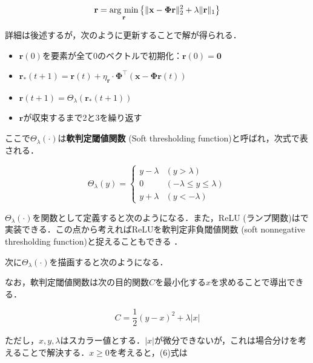 \begin{equation}
\mathbf{r} = \mathop{\rm arg~min}\limits_{\mathbf{r}}\left\{\|\mathbf{x}-\mathbf{\Phi}\mathbf{r}\|^2_2+\lambda\|\mathbf{r}\|_1\right\}
\end{equation}


詳細は後述するが，次のように更新することで解が得られる．

\begin{itemize}
\item $\mathbf{r}(0)$を要素が全て0のベクトルで初期化：$\mathbf{r}(0)=\mathbf{0}$
\item $\mathbf{r}_*(t+1)=\mathbf{r}(t)+\eta_\mathbf{r}\cdot \mathbf{\Phi}^\top(\mathbf{x}-\mathbf{\Phi}\mathbf{r}(t))$
\item $\mathbf{r}(t+1) = \Theta_\lambda(\mathbf{r}_*(t+1))$
\item $\mathbf{r}$が収束するまで2と3を繰り返す
\end{itemize}

ここで$\Theta_\lambda(\cdot)$は\textbf{軟判定閾値関数} (Soft thresholding function)と呼ばれ，次式で表される．


\begin{equation}
\Theta_\lambda(y)= 
\begin{cases} 
y-\lambda & (y>\lambda)\\ 
0 & (-\lambda\leq y\leq\lambda)\\ 
 y+\lambda & (y<-\lambda) 
\end{cases}
\end{equation}


$\Theta_\lambda(\cdot)$を関数として定義すると次のようになる．また，ReLU (ランプ関数)はで実装できる．この点から考えればReLUを軟判定非負閾値関数 (soft nonnegative thresholding function)と捉えることもできる \citep{Papyan2018-yr}．

次に$\Theta_\lambda(\cdot)$を描画すると次のようになる．


なお，軟判定閾値関数は次の目的関数$C$を最小化する$x$を求めることで導出できる．


\begin{equation}
C=\frac{1}{2}(y-x)^2+\lambda |x|
\end{equation}


ただし，$x, y, \lambda$はスカラー値とする．$|x|$が微分できないが，これは場合分けを考えることで解決する．$x\geq 0$を考えると，(6)式は


